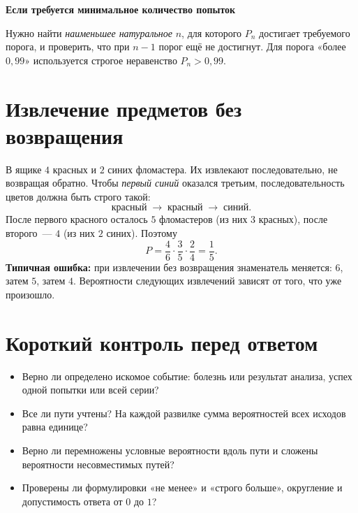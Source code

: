 \documentclass[a4paper,12pt]{article}
\newcommand{\smalltopic}[1]{\par\vspace{7pt}\noindent\textcolor{darkaccent}{\bfseries #1}\par\vspace{1pt}}
\newcommand{\important}[1]{\textcolor{darkaccent}{\bfseries #1}}
\begin{document}
\smalltopic{Если требуется минимальное количество попыток}
Нужно найти \emph{наименьшее натуральное} $n$, для которого $P_n$ достигает требуемого порога, и проверить, что при $n-1$ порог ещё не достигнут. Для порога «более $0{,}99$» используется строгое неравенство $P_n>0{,}99$.

\section{Извлечение предметов без возвращения}
В ящике $4$ красных и $2$ синих фломастера. Их извлекают последовательно, не возвращая обратно. Чтобы \emph{первый синий} оказался третьим, последовательность цветов должна быть строго такой:
\[
\text{красный}\;\to\;\text{красный}\;\to\;\text{синий}.
\]
После первого красного осталось $5$ фломастеров (из них $3$ красных), после второго~--- $4$ (из них $2$ синих). Поэтому
\[
P=\frac46\cdot\frac35\cdot\frac24=\boxed{\frac15}.
\]
\important{Типичная ошибка:} при извлечении без возвращения знаменатель меняется: $6$, затем $5$, затем $4$. Вероятности следующих извлечений зависят от того, что уже произошло.

\section{Короткий контроль перед ответом}
\begin{itemize}
\item Верно ли определено искомое событие: болезнь или результат анализа, успех одной попытки или всей серии?
\item Все ли пути учтены? На каждой развилке сумма вероятностей всех исходов равна единице?
\item Верно ли перемножены условные вероятности вдоль пути и сложены вероятности несовместимых путей?
\item Проверены ли формулировки «не менее» и «строго больше», округление и допустимость ответа от $0$ до $1$?
\end{itemize}
\end{document}
